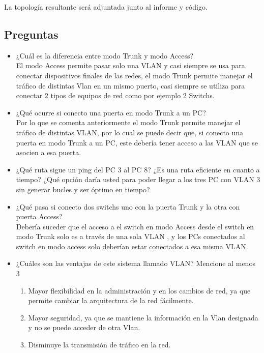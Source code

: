 \documentclass{article}
\begin{document}
La topología resultante será adjuntada junto al informe y código.

\newpage
\subsection{Preguntas \vspace{0.3cm}}
\begin{itemize}
    \item ¿Cuál es la diferencia entre modo Trunk y modo Access?\\
    \newline El modo Access permite pasar solo una VLAN y casi siempre se usa para conectar dispositivos finales de las redes, el modo Trunk permite manejar el tráfico de distintas Vlan en un mismo puerto, casi siempre se utiliza para conectar 2 tipos de equipos de red como por ejemplo 2 Switchs.
    \item ¿Qué ocurre si conecto una puerta en modo Trunk a un PC?\\
    \newline Por lo que se comenta anteriormente el modo Trunk permite manejar el tráfico de distintas VLAN, por lo cual se puede decir que, si conecto una puerta en modo Trunk a un PC, este debería tener acceso a las VLAN que se asocien a esa puerta.
    \item ¿Qué ruta sigue un ping del PC 3 al PC 8? ¿Es una ruta eficiente en cuanto a tiempo? ¿Qué opción daría usted para poder llegar a los tres PC con VLAN 3 sin generar bucles y ser óptimo en tiempo?\\
    \newline
    \item ¿Qué pasa si conecto dos switchs uno con la puerta Trunk y la otra con puerta Access?\\
    \newline Debería suceder que el acceso a el switch en modo Access desde el switch en modo Trunk solo es a través de una sola VLAN , y los PCs conectados al switch en modo access solo deberían estar conectados a esa misma VLAN.
    \item ¿Cuáles son las ventajas de este sistema llamado VLAN? Mencione al menos 3
     \begin{enumerate}
        \item Mayor flexibilidad en la administración y en los cambios de red, ya que permite cambiar la arquitectura de la red fácilmente.
        \item Mayor seguridad, ya que se mantiene la información en la Vlan designada y no se puede acceder de otra Vlan.
        \item Disminuye la transmisión de tráfico en la red.
    \end{enumerate}
\end{itemize}
\newpage
\end{document}

